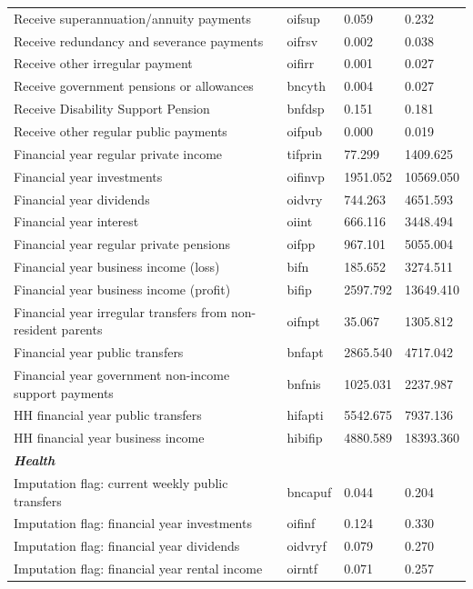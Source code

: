 \documentclass[12pt, a4paper]{article}
\begin{document}
\begin{landscape}
\begin{longtable}{p{} C{0.2\textwidth} C{0.2\textwidth} C{0.2\textwidth}}
Receive superannuation/annuity payments 	& 	oifsup	 & 	0.059	 & 	0.232	 \\
Receive redundancy and severance payments 	& 	oifrsv	 & 	0.002	 & 	0.038	 \\
Receive other irregular payment 	& 	oifirr	 & 	0.001	 & 	0.027	 \\
Receive government pensions or allowances 	& 	bncyth	 & 	0.004	 & 	0.027	 \\
Receive Disability Support Pension 	& 	bnfdsp	 & 	0.151	 & 	0.181	 \\
Receive other regular public payments 	& 	oifpub	 & 	0.000	 & 	0.019	 \\
Financial year regular private income 	& 	tifprin	 & 	77.299	 & 	1409.625	 \\
Financial year investments 	& 	oifinvp	 & 	1951.052	 & 	10569.050	 \\
Financial year dividends 	& 	oidvry	 & 	744.263	 & 	4651.593	 \\
Financial year interest 	& 	oiint	 & 	666.116	 & 	3448.494	 \\
Financial year regular private pensions 	& 	oifpp	 & 	967.101	 & 	5055.004	 \\
Financial year business income (loss) 	& 	bifn	 & 	185.652	 & 	3274.511	 \\
Financial year business income (profit) 	& 	bifip	 & 	2597.792	 & 	13649.410	 \\
Financial year irregular transfers from non-resident parents 	& 	oifnpt	 & 	35.067	 & 	1305.812	 \\
Financial year public transfers 	& 	bnfapt	 & 	2865.540	 & 	4717.042	 \\
Financial year government non-income support payments 	& 	bnfnis	 & 	1025.031	 & 	2237.987	 \\
HH financial year public transfers 	& 	hifapti	 & 	5542.675	 & 	7937.136	 \\
HH financial year business income 	& 	hibifip	 & 	4880.589	 & 	18393.360	 \\
\textbf{\textit{Health}} 	& 		 & 		 & 		 \\
Imputation flag: current weekly public transfers 	& 	bncapuf	 & 	0.044	 & 	0.204	 \\
Imputation flag: financial year investments 	& 	oifinf	 & 	0.124	 & 	0.330	 \\
Imputation flag: financial year dividends 	& 	oidvryf	 & 	0.079	 & 	0.270	 \\
Imputation flag: financial year rental income 	& 	oirntf	 & 	0.071	 & 	0.257	 \\

\end{longtable}
\end{landscape}
\end{document}
